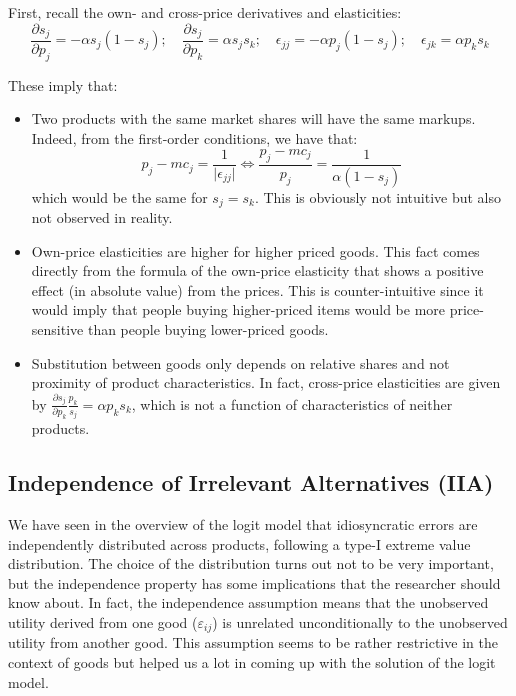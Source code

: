 First, recall the own- and cross-price derivatives and elasticities:
$$ \frac{\partial s_j}{\partial p_j}  = -\alpha s_j (1 - s_j) ; \quad \frac{\partial s_j}{\partial p_k}  = \alpha s_j s_k ; \quad \epsilon_{jj}  = -\alpha p_j (1 - s_j) ; \quad \epsilon_{jk}  = \alpha p_k s_k $$

These imply that:
\begin{itemize}

\item Two products with the same market shares will have the same markups. Indeed, from the first-order conditions, we have that: $$p_j - mc_j = \frac{1}{\vert\epsilon_{jj}\vert} \Leftrightarrow \frac{p_j - mc_j}{p_j} = \frac{1}{\alpha(1 - s_j)} $$ which would be the same for $s_j = s_k$. This is obviously not intuitive but also not observed in reality. 

\item Own-price elasticities are higher for higher priced goods. This fact comes directly from the formula of the own-price elasticity that shows a positive effect (in absolute value) from the prices. This is counter-intuitive since it would imply that people buying higher-priced items would be more price-sensitive than people buying lower-priced goods.

\item Substitution between goods only depends on relative shares and not proximity of product characteristics. In fact, cross-price elasticities are given by $\frac{\partial s_j}{\partial p_k}\frac{p_k}{s_j} = \alpha p_k s_k $, which is not a function of characteristics of neither products.

\end{itemize}

\subsection{Independence of Irrelevant Alternatives (IIA)}\label{sssec:logitiia}

We have seen in the overview of the logit model that idiosyncratic errors are independently distributed across products, following a type-I extreme value distribution. The choice of the distribution turns out not to be very important, but the independence property has some implications that the researcher should know about. In fact, the independence assumption means that the unobserved utility derived from one good ($\varepsilon_{ij}$) is unrelated unconditionally to the unobserved utility from another good. This assumption seems to be rather restrictive in the context of goods but helped us a lot in coming up with the solution of the logit model.

